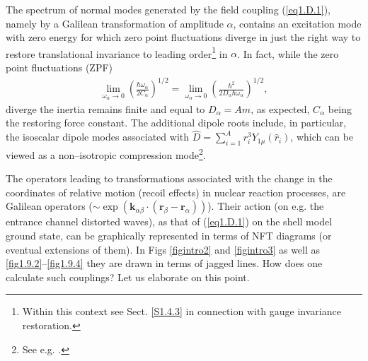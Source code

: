 \begin{subappendices}
The spectrum  of normal modes generated by the field coupling (\ref{eq1.D.1}), namely by a Galilean transformation of amplitude $\alpha$, contains an excitation mode with zero energy for which zero point fluctuations diverge in just the right way to restore translational invariance to leading order\footnote{Within this context see Sect. \ref{S1.4.3} in connection with gauge invariance restoration.} in $\alpha$. In fact, while the zero point fluctuations (ZPF)
\begin{align}\label{eq1.D.4}
\lim_{\omega_\alpha\to 0}\left(\frac{\hbar\omega_\alpha}{2C_\alpha}\right)^{1/2}=\lim_{\omega_\alpha\rightarrow 0}\left(\frac{\hbar^2}{2D_\alpha\hbar\omega_\alpha}\right)^{1/2},
\end{align}
diverge the inertia remains finite and equal to $D_\alpha=Am$, as expected, $C_\alpha$ being the restoring force constant.
The additional dipole roots include, in particular, the isoscalar dipole modes associated with $\hat D=\sum_{i=1}^{A}r^3_iY_{1\mu}(\hat r_i)$, which can be viewed as a non--isotropic compression mode\footnote{See e.g. \cite{Colo:00}.}.

The operators leading to transformations associated with the change in the coordinates of relative motion (recoil effects) in nuclear reaction processes, are Galilean operators ($\sim\exp\left(\mathbf k_{\alpha\beta}\cdot(\mathbf r_\beta-\mathbf{r}_\alpha)\right)$). Their action (on e.g. the entrance channel distorted waves), as that of (\ref{eq1.D.1}) on the shell model ground state, can be graphically represented in terms of NFT diagrams (or eventual extensions of them). In Figs \ref{figintro2} and \ref{figintro3} as well as \ref{fig1.9.2}--\ref{fig1.9.4}  they are drawn in terms of jagged lines. How does one  calculate such couplings? Let us elaborate  on this point.



\end{subappendices}
